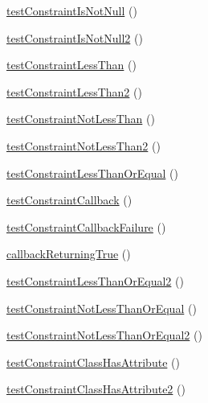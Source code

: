\begin{DoxyCompactItemize}
\item 
\mbox{\hyperlink{class_framework___constraint_test_a65e446a40f192b406f891a2cdfcc6304}{test\+Constraint\+Is\+Not\+Null}} ()
\item 
\mbox{\hyperlink{class_framework___constraint_test_af4c89eca418133df5129065abb972e63}{test\+Constraint\+Is\+Not\+Null2}} ()
\item 
\mbox{\hyperlink{class_framework___constraint_test_a0ba76a558f633df6c919604f3aede0d3}{test\+Constraint\+Less\+Than}} ()
\item 
\mbox{\hyperlink{class_framework___constraint_test_a8ac493080f049249aa5b051713f317fe}{test\+Constraint\+Less\+Than2}} ()
\item 
\mbox{\hyperlink{class_framework___constraint_test_aef862703084636ab650a413d6b8a91d5}{test\+Constraint\+Not\+Less\+Than}} ()
\item 
\mbox{\hyperlink{class_framework___constraint_test_ae0be79103d22621e1910bbcd61ebf0bf}{test\+Constraint\+Not\+Less\+Than2}} ()
\item 
\mbox{\hyperlink{class_framework___constraint_test_a85ff1f8482287350a267c49394dba31a}{test\+Constraint\+Less\+Than\+Or\+Equal}} ()
\item 
\mbox{\hyperlink{class_framework___constraint_test_a063fb3aa6258b3388522a3ff768f0806}{test\+Constraint\+Callback}} ()
\item 
\mbox{\hyperlink{class_framework___constraint_test_a062aaf1e9b3afb672e627431c42adeb4}{test\+Constraint\+Callback\+Failure}} ()
\item 
\mbox{\hyperlink{class_framework___constraint_test_ac8b5e7ee10b2dfc4efa4464004daeca4}{callback\+Returning\+True}} ()
\item 
\mbox{\hyperlink{class_framework___constraint_test_a70e80492186c3f951d67d045ed6ed6ec}{test\+Constraint\+Less\+Than\+Or\+Equal2}} ()
\item 
\mbox{\hyperlink{class_framework___constraint_test_af54fb61fe2aef9e9c98b039a52a99081}{test\+Constraint\+Not\+Less\+Than\+Or\+Equal}} ()
\item 
\mbox{\hyperlink{class_framework___constraint_test_a6e0f2db85b55995ce3923028dd37db0c}{test\+Constraint\+Not\+Less\+Than\+Or\+Equal2}} ()
\item 
\mbox{\hyperlink{class_framework___constraint_test_a6f908162ba33687cccc8015c46357cc8}{test\+Constraint\+Class\+Has\+Attribute}} ()
\item 
\mbox{\hyperlink{class_framework___constraint_test_a480281bad2243b891b17c738019d5ec7}{test\+Constraint\+Class\+Has\+Attribute2}} ()

\end{DoxyCompactItemize}
